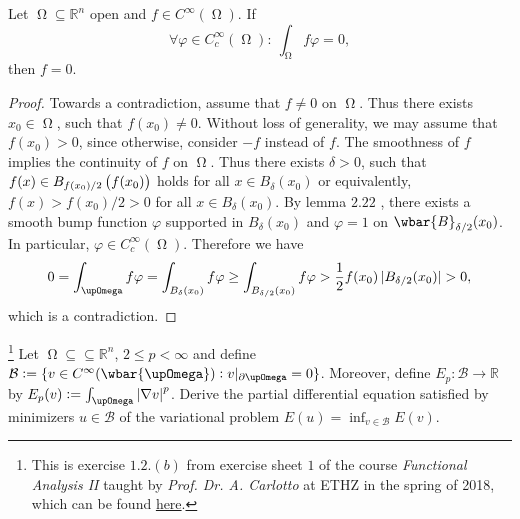 \begin{lemma}
	\label{lem:fundamental_lemma}
	Let $\upOmega \subseteq \mathbb{R}^n$ open and $f \in C^\infty(\upOmega)$. If
	\begin{equation*}
		\forall \varphi \in C^\infty_c(\upOmega): \> \int_\upOmega f\varphi = 0,
	\end{equation*}
	\noindent then $f = 0$.
\end{lemma}

\begin{proof}
	Towards a contradiction, assume that $f \neq 0$ on $\upOmega$. Thus there exists $x_0 \in \upOmega$, such that $f(x_0) \neq 0$. Without loss of generality, we may assume that $f(x_0) > 0$, since otherwise, consider $-f$ instead of $f$.	The smoothness of $f$ implies the continuity of $f$ on $\upOmega$. Thus there exists $\delta > 0$, such that $f(x) \in B_{f(x_0)/2}\del[1]{f(x_0)}$ holds for all $x \in B_\delta(x_0)$ or equivalently, $f(x) > f(x_0)/2 > 0$ for all $x \in B_\delta(x_0)$. By lemma $2.22$ \cite[42]{lee:smooth_manifolds:2013}, there exists a smooth bump function $\varphi$ supported in $B_\delta(x_0)$ and $\varphi = 1$ on $\wbar{B}_{\delta/2}(x_0)$. In particular, $\varphi \in C^\infty_c(\upOmega)$. Therefore we have
	\begin{equation*}
		0 = \int_\upOmega f \varphi = \int_{B_\delta(x_0)} f \varphi \geq \int_{B_{\delta/2}(x_0)} f \varphi > \frac{1}{2}f(x_0) \abs[0]{B_{\delta/2}(x_0)} > 0,
	\end{equation*}
	\noindent which is a contradiction.
\end{proof}

\begin{exercise}\footnote{This is exercise $1.2. (b)$ from exercise sheet $1$ of the course \emph{Functional Analysis II} taught by \emph{Prof. Dr. A. Carlotto} at ETHZ in the spring of 2018, which can be found \href{https://metaphor.ethz.ch/x/2018/fs/401-3462-00L/ex/Problems01-FAII.pdf}{here}.}
	Let $\upOmega \subseteq \subseteq \mathbb{R}^n$, $2 \leq p < \infty$ and define $\mathcal{B} := \cbr[0]{v \in C^\infty(\wbar{\upOmega}) : v\vert_{\partial\upOmega} = 0}$. Moreover, define $E_p : \mathcal{B} \to \mathbb{R}$ by $E_p(v) := \int_\upOmega \abs[0]{\nabla v}^p$. Derive the partial differential equation satisfied by minimizers $u \in \mathcal{B}$ of the variational problem $E(u) = \inf_{v \in \mathcal{B}}E(v)$.	
\end{exercise}
